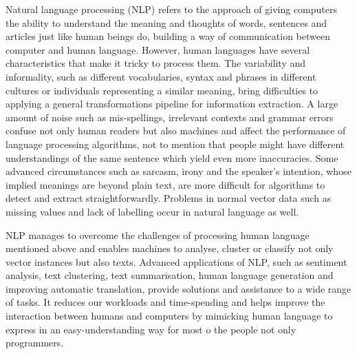 Natural language processing (NLP) refers to the approach of giving computers the ability to understand the meaning and thoughts of words, sentences and articles just like human beings do, building a way of communication between computer and human language.
However, human languages have several characteristics that make it tricky to process them.
The variability and informality, such as different vocabularies, syntax and phrases in different cultures or individuals representing a similar meaning, bring difficulties to applying a general transformations pipeline for information extraction.
A large amount of noise such as mis-spellings, irrelevant contexts and grammar errors confuse not only human readers but also machines and affect the performance of language processing algorithms, not to mention that people might have different understandings of the same sentence which yield even more inaccuracies.
Some advanced circumstances such as sarcasm, irony and the speaker's intention, whose implied meanings are beyond plain text, are more difficult for algorithms to detect and extract straightforwardly. 
Problems in normal vector data such as missing values and lack of labelling occur in natural language as well.

NLP manages to overcome the challenges of processing human language mentioned above and enables machines to analyse, cluster or classify not only vector instances but also texts. 
Advanced applications of NLP, such as sentiment analysis, text clustering, text summarisation, human language generation and improving automatic translation, provide solutions and assistance to a wide range of tasks. 
It reduces our workloads and time-spending and helps improve the interaction between humans and computers by mimicking human language to express in an easy-understanding way for most o the people not only programmers.

